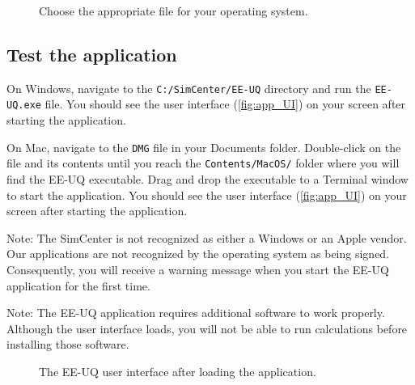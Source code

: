 \begin{figure}[!htbp]
  \caption{Choose the appropriate file for your operating system.}
  \label{fig:app_choose_file}
\end{figure}

\subsection{Test the application}

On Windows, navigate to the \texttt{C:/SimCenter/EE-UQ} directory and run the \texttt{EE-UQ.exe} file. You should see the user interface (\autoref{fig:app_UI}) on your screen after starting the application.

On Mac, navigate to the \texttt{DMG} file in your Documents folder. Double-click on the file and its contents until you reach the \texttt{Contents/MacOS/} folder where you will find the EE-UQ executable. Drag and drop the executable to a Terminal window to start the application. You should see the user interface (\autoref{fig:app_UI}) on your screen after starting the application.

Note: The SimCenter is not recognized as either a Windows or an Apple vendor. Our applications are not recognized by the operating system as being signed. Consequently, you will receive a warning message when you start the EE-UQ application for the first time.

Note: The EE-UQ application requires additional software to work properly. Although the user interface loads, you will not be able to run calculations before installing those software.

\begin{figure}[!htbp]
  \caption{The EE-UQ user interface after loading the application.}
  \label{fig:app_UI}
\end{figure}


